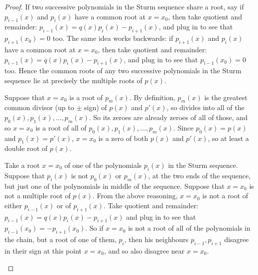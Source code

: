 \begin{proof}
If two successive polynomials in the Sturm sequence share a root, say if \(p_{i-1}(x)\) and \(p_i(x)\) have a common root at \(x=x_0\), then take quotient and remainder:
\(p_{i-1}(x) = q(x) p_i(x) - p_{i+1}(x)\), and plug in to see that \(p_{i+1}(x_0)=0\) too.
The same idea works backwards: if \(p_{i+1}(x)\) and \(p_i(x)\) have a common root at \(x=x_0\), then take quotient and remainder: \(p_{i-1}(x) = q(x) p_i(x) - p_{i+1}(x)\), and plug in to see that \(p_{i-1}(x_0)=0\) too.
Hence the common roots of any two successive polynomials in the Sturm sequence lie at precisely the multiple roots of \(p(x)\).

Suppose that \(x=x_0\) is a root of \(p_m(x)\).
By definition, \(p_m(x)\) is the greatest common divisor (up to \(\pm\) sign) of \(p(x)\) and \(p'(x)\), so divides into all of the \(p_0(x), p_1(x), \dots, p_m(x)\).
So its zeroes are already zeroes of all of those, and so \(x=x_0\) is a root of all of \(p_0(x), p_1(x), \dots, p_m(x)\).
Since \(p_0(x)=p(x)\) and \(p_1(x)=p'(x)\), \(x=x_0\) is a zero of both \(p(x)\) and \(p'(x)\), so at least a double root of \(p(x)\).

Take a root \(x=x_0\) of one of the polynomials \(p_i(x)\) in the Sturm sequence.
Suppose that \(p_i(x)\) is not \(p_0(x)\) or \(p_m(x)\), at the two ends of the sequence, but just one of the polynomials in middle of the sequence.
Suppose that \(x=x_0\) is not a multiple root of \(p(x)\).
From the above reasoning, \(x=x_0\) is not a root of either \(p_{i-1}(x)\) or of \(p_{i+1}(x)\).
Take quotient and remainder: \(p_{i-1}(x) = q(x) p_i(x) - p_{i+1}(x)\) and plug in to see that 
\(p_{i-1}(x_0)=-p_{i+1}(x_0)\).
So if \(x=x_0\) is not a root of all of the polynomials in the chain, but a root of one of them, \(p_i\), then his neighbours \(p_{i-1}, p_{i+1}\) disagree in their sign at this point \(x=x_0\), and so also disagree near \(x=x_0\).
\begin{center}
\qquad
\qquad
\qquad

\end{center}


\end{proof}
